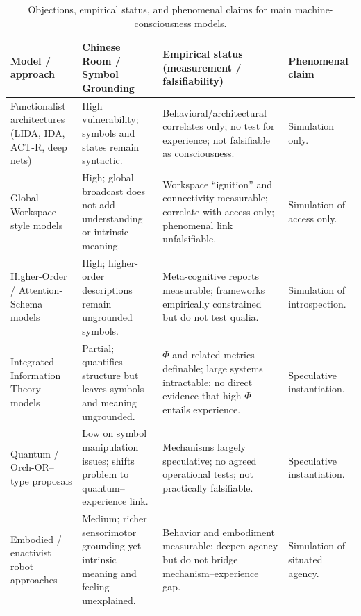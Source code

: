 \begin{table}[htbp]
  \centering
  \begin{footnotesize}
  \caption{Objections, empirical status, and phenomenal claims for main machine-consciousness models.}
  \label{tab:mc_objections}
  \begin{tabularx}{\textwidth}{@{}Y Y Y Y@{}}
  \toprule
  \textbf{Model / approach} & \textbf{Chinese Room / Symbol Grounding} & \textbf{Empirical status (measurement / falsifiability)} & \textbf{Phenomenal claim} \\
  \midrule
  Functionalist architectures (LIDA, IDA, ACT-R, deep nets) & High vulnerability; symbols and states remain syntactic. & Behavioral/architectural correlates only; no test for experience; not falsifiable as consciousness. & Simulation only. \\[6pt]
  Global Workspace--style models & High; global broadcast does not add understanding or intrinsic meaning. & Workspace ``ignition'' and connectivity measurable; correlate with access only; phenomenal link unfalsifiable. & Simulation of access only. \\[6pt]
  Higher-Order / Attention-Schema models & High; higher-order descriptions remain ungrounded symbols. & Meta-cognitive reports measurable; frameworks empirically constrained but do not test qualia. & Simulation of introspection. \\[6pt]
  Integrated Information Theory models & Partial; quantifies structure but leaves symbols and meaning ungrounded. & $\Phi$ and related metrics definable; large systems intractable; no direct evidence that high $\Phi$ entails experience. & Speculative instantiation. \\[6pt]
  Quantum / Orch-OR--type proposals & Low on symbol manipulation issues; shifts problem to quantum--experience link. & Mechanisms largely speculative; no agreed operational tests; not practically falsifiable. & Speculative instantiation. \\[6pt]
  Embodied / enactivist robot approaches & Medium; richer sensorimotor grounding yet intrinsic meaning and feeling unexplained. & Behavior and embodiment measurable; deepen agency but do not bridge mechanism--experience gap. & Simulation of situated agency. \\
  \bottomrule
  \end{tabularx}
  \end{footnotesize}
\end{table}



